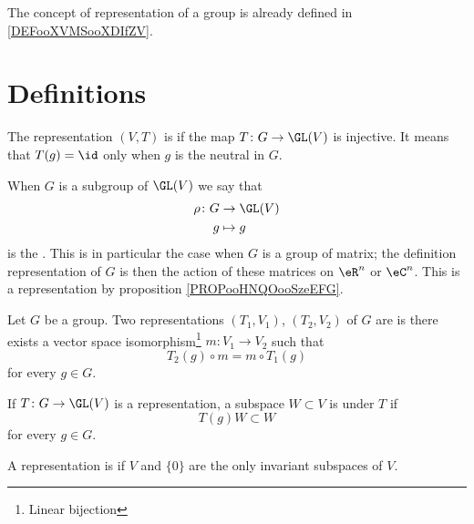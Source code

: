 The concept of representation of a group is already defined in \ref{DEFooXVMSooXDIfZV}.

\section{Definitions}

\begin{definition}      \label{DEFooAFSAooGDSDBb}
    The representation \( (V,T)\) is  if the map \( T\colon G\to \GL(V)\) is injective. It means that \( T(g)=\id\) only when \( g\) is the neutral in \( G\).
\end{definition}

When \( G\) is a subgroup of \( \GL(V)\) we say that
\begin{equation}
    \begin{aligned}
        \rho\colon G&\to \GL(V) \\
        g&\mapsto g 
    \end{aligned}
\end{equation}
is the . This is in particular the case when \( G\) is a group of matrix; the definition representation of \( G\) is then the action of these matrices on \( \eR^n\) or \( \eC^n\). This is a representation by proposition \ref{PROPooHNQOooSzeEFG}.

\begin{definition}
    Let \( G\) be a group. Two representations \( (T_1,V_1)\), \( (T_2,V_2)\) of \( G\) are  is there exists a vector space isomorphism\footnote{Linear bijection} \( m\colon V_1\to V_2\) such that
    \begin{equation}
        T_2(g)\circ m=m\circ T_1(g)
    \end{equation}
    for every \( g\in G\).
\end{definition}

\begin{definition}
    If \( T\colon G\to \GL(V)\) is a representation, a subspace \( W\subset V\) is  under \( T\) if
    \begin{equation}
        T(g)W\subset W
    \end{equation}
    for every \( g\in G\).

    A representation is  if \( V\) and \( \{ 0 \}\) are the only invariant subspaces of \( V\).
\end{definition}

